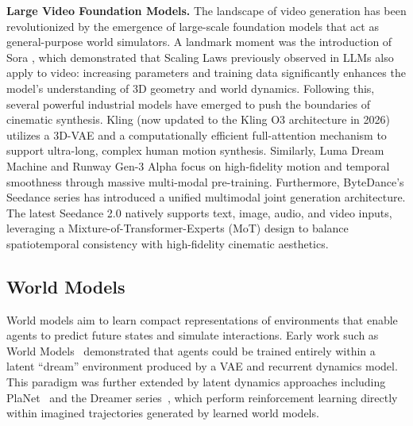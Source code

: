 \documentclass{llmxive}
\begin{document}
\textbf{Large Video Foundation Models.} 
The landscape of video generation has been revolutionized by the emergence of large-scale foundation models that act as general-purpose world simulators. A landmark moment was the introduction of Sora \href{https://openai.com/index/video-generation-models-as-world-simulators/}{\cite{brooks2024video}}, which demonstrated that Scaling Laws \cite{kaplan2020scaling} previously observed in LLMs also apply to video: increasing parameters and training data significantly enhances the model's understanding of 3D geometry and world dynamics. 
Following this, several powerful industrial models have emerged to push the boundaries of cinematic synthesis. Kling \href{https://klingai.com/}{\cite{kuaishou2024kling}} (now updated to the Kling O3 architecture in 2026) utilizes a 3D-VAE and a computationally efficient full-attention mechanism to support ultra-long, complex human motion synthesis. Similarly, Luma Dream Machine \href{https://lumalabs.ai/dream-machine}{\cite{luma2024dream}} and Runway Gen-3 Alpha \href{https://runwayml.com/blog/introducing-gen-3-alpha/}{\cite{runway2024gen3}} focus on high-fidelity motion and temporal smoothness through massive multi-modal pre-training. 
 Furthermore, ByteDance's Seedance series \href{https://lf3-static.bytednsdoc.com/obj/eden-cn/bdeh7uhpsuht/Seedance%201.0%20Paper.pdf}{\cite{bytedance2025seedance}} has introduced a unified multimodal joint generation architecture. The latest Seedance 2.0 natively supports text, image, audio, and video inputs, leveraging a Mixture-of-Transformer-Experts (MoT) design to balance spatiotemporal consistency with high-fidelity cinematic aesthetics.

\subsection{World Models}
 
World models aim to learn compact representations of environments that enable agents to predict future states and simulate interactions. Early work such as World Models~\cite{ha2018world} demonstrated that agents could be trained entirely within a latent ``dream'' environment produced by a VAE and recurrent dynamics model. This paradigm was further extended by latent dynamics approaches including PlaNet~\cite{hafner2019planet} and the Dreamer series~\cite{hafner2019dream, hafner2020mastering, hafner2023mastering}, which perform reinforcement learning directly within imagined trajectories generated by learned world models.
\end{document}
